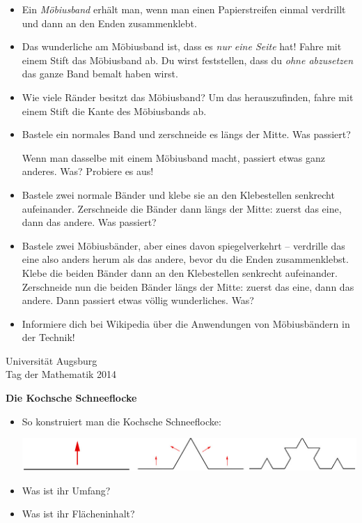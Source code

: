 \documentclass[a4paper,ngerman]{scrartcl}
\newcommand{\drawHere}{%
  \begin{center}%
    \fbox{\parbox[c][0.9\textwidth]{0.9\textwidth}{\ }}%
  \end{center}}
\newcommand{\header}{%
  \begin{raggedleft}
  \tiny Universität Augsburg \\
  Tag der Mathematik 2014 \par
  \end{raggedleft}}
\begin{document}
\vspace{10 mm}
\Large
\begin{itemize}
  \item Ein \emph{Möbiusband} erhält man, wenn man einen Papierstreifen einmal
  verdrillt und dann an den Enden zusammenklebt.

  \item Das wunderliche am Möbiusband ist, dass es \emph{nur eine Seite} hat!
  Fahre mit einem Stift das Möbiusband ab. Du wirst feststellen, dass du
  \emph{ohne abzusetzen} das ganze Band bemalt haben wirst.
  
  \item Wie viele Ränder besitzt das Möbiusband? Um das herauszufinden, fahre
  mit einem Stift die Kante des Möbiusbands ab.

  \item Bastele ein normales Band und zerschneide es längs der Mitte. Was
  passiert?
  
  Wenn man dasselbe mit einem Möbiusband macht, passiert etwas ganz anderes.
  Was? Probiere es aus!

  \item Bastele zwei normale Bänder und klebe sie an den Klebestellen senkrecht
  aufeinander. Zerschneide die Bänder dann längs der Mitte: zuerst das eine,
  dann das andere. Was passiert?

  \item Bastele zwei Möbiusbänder, aber eines davon spiegelverkehrt --
  verdrille das eine also anders herum als das andere, bevor du die Enden
  zusammenklebst. Klebe die beiden Bänder dann an den Klebestellen senkrecht
  aufeinander. Zerschneide nun die beiden Bänder längs der Mitte: zuerst das
  eine, dann das andere. Dann passiert etwas völlig wunderliches. Was?

  \item Informiere dich bei Wikipedia über die Anwendungen von Möbiusbändern in
  der Technik!
\end{itemize}

\newpage


\header

\begin{center}
  \Huge\bf
  Die Kochsche Schneeflocke
\end{center}

\vfill
\drawHere

\vfill
\Large

\renewcommand{\labelitemi}{$\bigstar$}

\begin{itemize}
  \item So konstruiert man die Kochsche Schneeflocke:

  \begin{center}
    \includegraphics[scale=0.5]{koch}
  \end{center}
  \item Was ist ihr Umfang?
  \item Was ist ihr Flächeninhalt?
\end{itemize}
\end{document}

